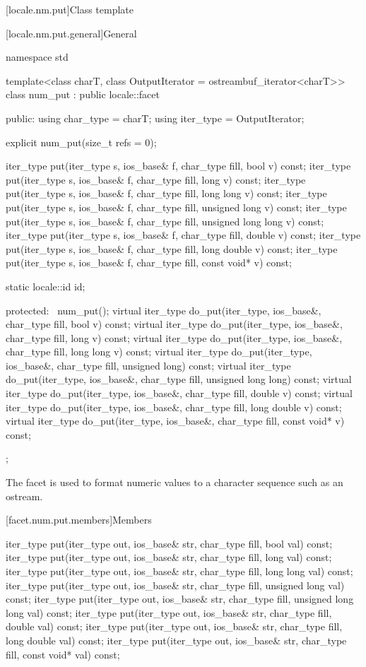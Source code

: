 [locale.nm.put]{Class template }

[locale.nm.put.general]{General}

%
\begin{codeblock}
namespace std {
  template<class charT, class OutputIterator = ostreambuf_iterator<charT>>
    class num_put : public locale::facet {
    public:
      using char_type = charT;
      using iter_type = OutputIterator;

      explicit num_put(size_t refs = 0);

      iter_type put(iter_type s, ios_base& f, char_type fill, bool v) const;
      iter_type put(iter_type s, ios_base& f, char_type fill, long v) const;
      iter_type put(iter_type s, ios_base& f, char_type fill, long long v) const;
      iter_type put(iter_type s, ios_base& f, char_type fill, unsigned long v) const;
      iter_type put(iter_type s, ios_base& f, char_type fill, unsigned long long v) const;
      iter_type put(iter_type s, ios_base& f, char_type fill, double v) const;
      iter_type put(iter_type s, ios_base& f, char_type fill, long double v) const;
      iter_type put(iter_type s, ios_base& f, char_type fill, const void* v) const;

      static locale::id id;

    protected:
      ~num_put();
      virtual iter_type do_put(iter_type, ios_base&, char_type fill, bool v) const;
      virtual iter_type do_put(iter_type, ios_base&, char_type fill, long v) const;
      virtual iter_type do_put(iter_type, ios_base&, char_type fill, long long v) const;
      virtual iter_type do_put(iter_type, ios_base&, char_type fill, unsigned long) const;
      virtual iter_type do_put(iter_type, ios_base&, char_type fill, unsigned long long) const;
      virtual iter_type do_put(iter_type, ios_base&, char_type fill, double v) const;
      virtual iter_type do_put(iter_type, ios_base&, char_type fill, long double v) const;
      virtual iter_type do_put(iter_type, ios_base&, char_type fill, const void* v) const;
    };
}
\end{codeblock}

\pnum
The facet
is used to format numeric values to a character sequence such as an ostream.

[facet.num.put.members]{Members}

%
\begin{itemdecl}
iter_type put(iter_type out, ios_base& str, char_type fill, bool val) const;
iter_type put(iter_type out, ios_base& str, char_type fill, long val) const;
iter_type put(iter_type out, ios_base& str, char_type fill, long long val) const;
iter_type put(iter_type out, ios_base& str, char_type fill, unsigned long val) const;
iter_type put(iter_type out, ios_base& str, char_type fill, unsigned long long val) const;
iter_type put(iter_type out, ios_base& str, char_type fill, double val) const;
iter_type put(iter_type out, ios_base& str, char_type fill, long double val) const;
iter_type put(iter_type out, ios_base& str, char_type fill, const void* val) const;
\end{itemdecl}

